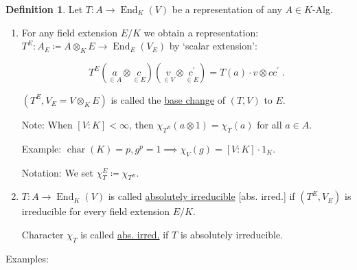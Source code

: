 \documentclass{article}
\theoremstyle{definition}
\newtheorem*{definition}{Definition}
\theoremstyle{plain}
\theoremstyle{remark}
\begin{document}
    \begin{definition}
        Let \(T: A \to \operatorname{End}_K (V)\) be a representation of any \(A\in K\)-Alg.

        \begin{enumerate}[label=\arabic*)]
            \item For any field extension \(E / K\) we obtain a representation: \(T^E : A_E \coloneqq A \otimes_K E \to \operatorname{End}_E(V_E)\) by `scalar extension':
            
            \[
                T^E(\underset{\in A}{a} \otimes \underset{\in E}{c})(\underset{\in V}{v} \otimes \underset{\in E}{c^{\prime}}) = T(a) \cdot v \otimes cc^{\prime}\;.
            \]

            \((T^E , V_E = V \otimes_K E)\) is called the \underline{base change} of \((T,V)\) to \(E\).

            Note: When \([V:K] < \infty\), then \(\chi_{T^E}(a \otimes 1) = \chi_T(a)\) for all \(a\in A\).

            Example: \(\operatorname{char} (K) = p, g^p = 1 \implies \chi_V(g) = [V:K] \cdot 1_K\).

            Notation: We set \(\chi_T^E \coloneqq \chi_{T^E}\).

            \item \(T: A \to \operatorname{End}_K(V)\) is called \underline{absolutely irreducible} [abs. irred.] if \((T^E, V_E)\) is irreducible for every field extension \(E / K\).
            
            Character \(\chi_T\) is called \underline{abs. irred.} if \(T\) is absolutely irreducible.

        \end{enumerate} 
    \end{definition}

    Examples:
\end{document}
